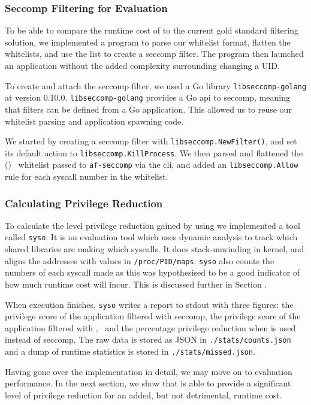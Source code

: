 \subsubsection{Seccomp Filtering for Evaluation}

To be able to compare the runtime cost of \af to the current gold standard
filtering solution, we implemented a program to parse our whitelist format,
flatten the whitelists, and use the list to create a seccomp filter. The program
then launched an application without the added complexity surrounding changing
a UID.

To create and attach the seccomp filter, we used a Go library 
\texttt{libseccomp-golang} at version 0.10.0. \texttt{libseccomp-golang}
provides a Go \ac{api} to seccomp, meaning that filters can be defined from a
Go application. This allowed us to reuse our whitelist parsing and application
spawning code.

We started by creating a seccomp filter with \texttt{libseccomp.NewFilter()}, 
and set its default action to \texttt{libseccomp.KillProcess}. We then parsed
and flattened the (\afss)~ whitelist passed to \texttt{af-seccomp} via the
\ac{cli}, and added an \texttt{libseccomp.Allow} rule for each syscall number in
the whitelist.


\subsubsection{Calculating Privilege Reduction}

To calculate the level privilege reduction gained by using \af we implemented a
tool called \texttt{syso}. It is an evaluation tool which uses dynamic analysis
to track which shared libraries are making which syscalls. It does
stack-unwinding in kernel, and aligns the addresses with values in
\texttt{/proc/PID/maps}. \texttt{syso} also counts the numbers of each syscall 
made as this was hypothesised to be a good indicator of how much runtime cost
\af will incur. This is discussed further in Section .

When execution finishes, \texttt{syso} writes a report to \ac{stdout} with three
figures: the privilege score of the application filtered with seccomp, the
privilege score of the application filtered with \afss,~ and the percentage
privilege reduction when \af is used instead of seccomp. The raw data is stored
as JSON in \texttt{./stats/counts.json} and a dump of runtime statistics is
stored in \texttt{./stats/missed.json}.

Having gone over the implementation in detail, we may move on to evaluation
\afg performance. In the next section, we show that \af is able to provide a
significant level of privilege reduction for an added, but not detrimental,
runtime cost.
